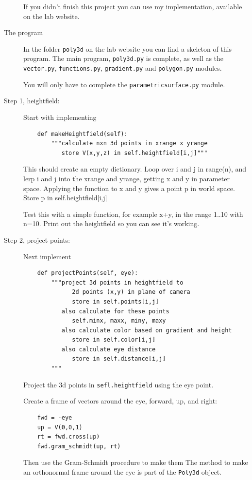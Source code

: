 \documentclass[12pt]{article}
\begin{document}
\begin{description}
If you didn't finish this project you can use my implementation,
available on the lab website.

\item[The program]  In the folder \lstinline{poly3d} on the
lab website you can find a skeleton of this program.  The main
program, \lstinline{poly3d.py} is complete, as well as the 
\lstinline{vector.py}, \lstinline{functions.py}, \lstinline{gradient.py}
 and \lstinline{polygon.py}
modules.

You will only have to complete the \lstinline{parametricsurface.py} module.

\item[Step 1, heightfield:]  
Start with implementing 
\begin{lstlisting}
    def makeHeightfield(self):
        """calculate nxn 3d points in xrange x yrange
           store V(x,y,z) in self.heightfield[i,j]"""
\end{lstlisting}

This should create an empty dictionary.  Loop over
i and j in range(n), and lerp i and j into the xrange 
and yrange, getting x and y in parameter space.
Applying the function to x and y gives a point p in world
space.  Store p in self.heightfield[i,j]

Test this with a simple function, for example x+y,
in the range 1..10 with n=10.  Print out the heightfield
so you can see it's working.

\item[Step 2, project points:] 
Next implement
\begin{lstlisting}
    def projectPoints(self, eye):
        """project 3d points in heightfield to
              2d points (x,y) in plane of camera
              store in self.points[i,j]
           also calculate for these points
              self.minx, maxx, miny, maxy
           also calculate color based on gradient and height
              store in self.color[i,j]
           also calculate eye distance
              store in self.distance[i,j]
        """
\end{lstlisting}
Project the 3d points in \lstinline{sefl.heightfield} using the eye
point.  

Create a frame of vectors around the eye, forward, up, and right:
\begin{lstlisting}
    fwd = -eye
    up = V(0,0,1)
    rt = fwd.cross(up)
    fwd.gram_schmidt(up, rt)
\end{lstlisting}
Then use the Gram-Schmidt procedure to make them
The method to make an orthonormal frame around 
the eye is part of the \lstinline{Poly3d} object.


\end{description}
\end{document}
